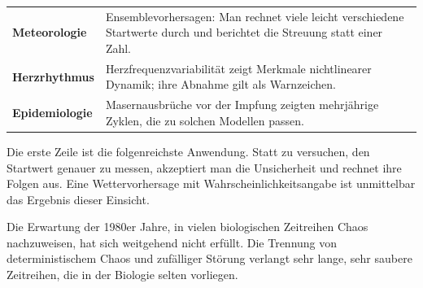 \begin{forschung}
\begin{center}
{\small
\renewcommand{\arraystretch}{1.45}
\begin{tabular}{@{}P{2.8cm}P{5.4cm}@{}}
\toprule
\textbf{Meteorologie} & Ensemblevorhersagen: Man rechnet viele leicht verschiedene Startwerte durch und berichtet die Streuung statt einer Zahl.\\
\textbf{Herzrhythmus} & Herzfrequenzvariabilität zeigt Merkmale nichtlinearer Dynamik; ihre Abnahme gilt als Warnzeichen.\\
\textbf{Epidemiologie} & Masernausbrüche vor der Impfung zeigten mehrjährige Zyklen, die zu solchen Modellen passen.\\
\bottomrule
\end{tabular}}
\end{center}

Die erste Zeile ist die folgenreichste Anwendung. Statt zu versuchen, den Startwert genauer zu messen, akzeptiert man die Unsicherheit und rechnet ihre Folgen aus. Eine Wettervorhersage mit Wahrscheinlichkeitsangabe ist unmittelbar das Ergebnis dieser Einsicht.

\begin{center}
\begin{minipage}{0.88\textwidth}
\end{minipage}
\end{center}

Die Erwartung der 1980er Jahre, in vielen biologischen Zeitreihen Chaos nachzuweisen, hat sich weitgehend nicht erfüllt. Die Trennung von deterministischem Chaos und zufälliger Störung verlangt sehr lange, sehr saubere Zeitreihen, die in der Biologie selten vorliegen.

\begin{center}
\begin{minipage}{0.88\textwidth}
\end{minipage}
\end{center}
\end{forschung}

